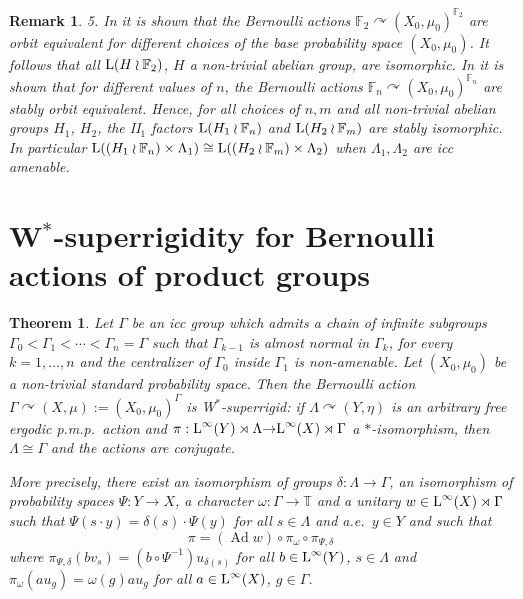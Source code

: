\documentclass[a4paper,11pt]{amsart}
\numberwithin{equation}{section}
\newtheorem{remark}[definition]{Remark}
\newtheorem{theorem}[definition]{Theorem}
\begin{document}
\begin{remark}
5. In \cite[Corollary 1.2]{Bo09a} it is shown that the Bernoulli actions ${\mathbb{F}}_2 {\curvearrowright} (X_0,\mu_0)^{{\mathbb{F}}_2}$ are orbit equivalent for different choices of the base probability space $(X_0,\mu_0)$. It follows that all ${\mathord{\text{\rm L}}}(H \wr {\mathbb{F}}_2)$, $H$ a non-trivial abelian group, are isomorphic. In \cite[Theorem 1.1]{Bo09b} it is shown that for different values of $n$, the Bernoulli actions ${\mathbb{F}}_n {\curvearrowright} (X_0,\mu_0)^{{\mathbb{F}}_n}$ are stably orbit equivalent. Hence, for all choices of $n,m$ and all non-trivial abelian groups $H_1$, $H_2$, the II$_1$ factors ${\mathord{\text{\rm L}}}(H_1 \wr {\mathbb{F}}_n)$ and ${\mathord{\text{\rm L}}}(H_2 \wr {\mathbb{F}}_m)$ are stably isomorphic. In particular ${\mathord{\text{\rm L}}}((H_1 \wr {\mathbb{F}}_n) \times \Lambda_1) \cong {\mathord{\text{\rm L}}}((H_2 \wr {\mathbb{F}}_m) \times \Lambda_2)$ when $\Lambda_1,\Lambda_2$ are icc amenable.
\end{remark}

\section{W$^*$-superrigidity for Bernoulli actions of product groups}\label{sec.Wstarsuperrigidity}

\begin{theorem}\label{thm.Wstarsuperrigid}
Let $\Gamma$ be an icc group which admits a chain of infinite subgroups $\Gamma_0<\Gamma_1< \cdots <\Gamma_n=\Gamma$ such that $\Gamma_{k-1}$ is almost normal in $\Gamma_k$, for every $k=1,\ldots,n$ and the centralizer of $\Gamma_0$ inside $\Gamma_1$ is non-amenable. Let $(X_0,\mu_0)$ be a non-trivial standard probability space.
Then the Bernoulli action $\Gamma {\curvearrowright} (X,\mu):= (X_0,\mu_0)^\Gamma$ is W$^*$-superrigid: if $\Lambda {\curvearrowright} (Y,\eta)$ is an arbitrary free ergodic p.m.p.\ action and $\pi : {\mathord{\text{\rm L}}}^\infty(Y) \rtimes \Lambda {\rightarrow} {\mathord{\text{\rm L}}}^\infty(X) \rtimes \Gamma$ a $*$-isomorphism, then $\Lambda \cong \Gamma$ and the actions are conjugate.

More precisely, there exist an isomorphism of groups $\delta : \Lambda {\rightarrow} \Gamma$, an isomorphism of probability spaces $\Psi : Y {\rightarrow} X$, a character $\omega : \Gamma {\rightarrow} {\mathbb{T}}$ and a unitary $w \in {\mathord{\text{\rm L}}}^\infty(X) \rtimes \Gamma$ such that $\Psi(s \cdot y) = \delta(s) \cdot \Psi(y)$ for all $s \in \Lambda$ and a.e.\ $y \in Y$ and such that
$$\pi = ({\operatorname{Ad}} w) \circ \pi_{\omega} \circ \pi_{\Psi,\delta}$$
where $\pi_{\Psi,\delta}(b v_s) = (b \circ \Psi^{-1}) u_{\delta(s)}$ for all $b \in {\mathord{\text{\rm L}}}^\infty(Y)$, $s \in \Lambda$ and $\pi_{\omega}(au_g) = {\omega}(g) a u_g$ for all $a \in {\mathord{\text{\rm L}}}^\infty(X)$, $g \in \Gamma$.
\end{theorem}
\end{document}
